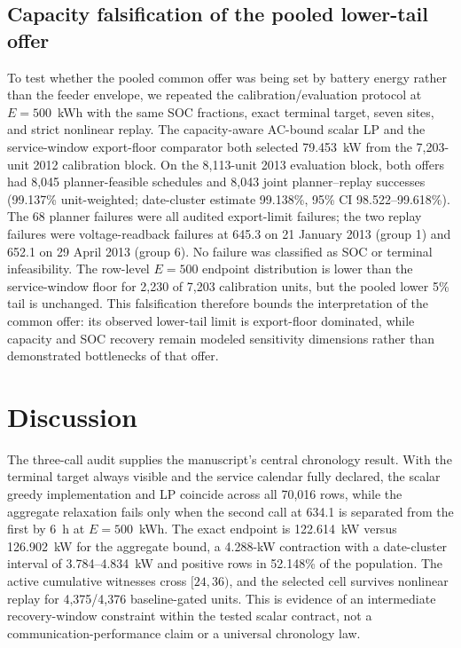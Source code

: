 \documentclass[11pt]{article}
\begin{document}
\subsection{Capacity falsification of the pooled lower-tail offer}
To test whether the pooled common offer was being set by battery energy rather than the feeder envelope, we repeated the calibration/evaluation protocol at $E=500$~kWh with the same SOC fractions, exact terminal target, seven sites, and strict nonlinear replay. The capacity-aware AC-bound scalar LP and the service-window export-floor comparator both selected 79.453~kW from the 7,203-unit 2012 calibration block. On the 8,113-unit 2013 evaluation block, both offers had 8,045 planner-feasible schedules and 8,043 joint planner--replay successes (99.137\% unit-weighted; date-cluster estimate 99.138\%, 95\% CI 98.522--99.618\%). The 68 planner failures were all audited export-limit failures; the two replay failures were voltage-readback failures at 645.3 on 21 January 2013 (group 1) and 652.1 on 29 April 2013 (group 6). No failure was classified as SOC or terminal infeasibility. The row-level $E=500$ endpoint distribution is lower than the service-window floor for 2,230 of 7,203 calibration units, but the pooled lower 5\% tail is unchanged. This falsification therefore bounds the interpretation of the common offer: its observed lower-tail limit is export-floor dominated, while capacity and SOC recovery remain modeled sensitivity dimensions rather than demonstrated bottlenecks of that offer.

\clearpage
\section{Discussion}
The three-call audit supplies the manuscript's central chronology result. With the terminal target always visible and the service calendar fully declared, the scalar greedy implementation and LP coincide across all 70,016 rows, while the aggregate relaxation fails only when the second call at 634.1 is separated from the first by 6~h at \(E=500\)~kWh. The exact endpoint is 122.614~kW versus 126.902~kW for the aggregate bound, a 4.288-kW contraction with a date-cluster interval of 3.784--4.834~kW and positive rows in 52.148\% of the population. The active cumulative witnesses cross \([24,36)\), and the selected cell survives nonlinear replay for 4,375/4,376 baseline-gated units. This is evidence of an intermediate recovery-window constraint within the tested scalar contract, not a communication-performance claim or a universal chronology law.
\end{document}
